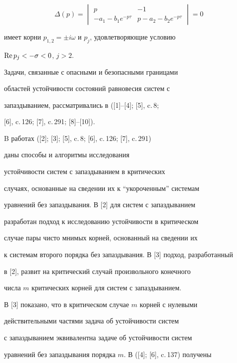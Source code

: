 \begin{equation} 


\Delta(p)= 


\begin{vmatrix} 


p & - 1 \\ -a_1-b_1e^{-p\tau} & p-a_2-b_2e^{-p\tau} 


\end{vmatrix} 


=0 


\end{equation} 


имеет корни $p_{1,2}=\pm i\omega$ и $p_j$, удовлетворяющие условию 


$\operatorname{Re} p_j<-\sigma<0$, $j>2$. 


 


Задачи, связанные с опасными и безопасными границами 


областей устойчивости состояний равновесия систем с 


запаздыванием, рассматривались в ([1]--[4]; [5], c.\,8; 


[6], c.\,126; [7], c.\,291; [8]--[10]). 


B работах ([2]; [3]; [5], c.\,8; [6], c.\,126; [7], c.\,291) 


даны способы и алгоритмы исследования 


устойчивости систем с запаздыванием в критических 


случаях, основанные на сведении их к ``укороченным'' системам 


уравнений без запаздывания. В [2] для систем с запаздыванием 


разработан подход к исследованию устойчивости в критическом 


случае пары чисто мнимых корней, основанный на сведении их 


к системам второго порядка без запаздывания. В [3] подход, разработанный 


в [2], развит на критический случай произвольного конечного 


числа $m$ критических корней для систем с запаздыванием. 


В [3] показано, что в критическом случае $m$ корней с нулевыми 


действительными частями задача об устойчивости систем 


с запаздыванием эквивалентна задаче об устойчивости систем 


уравнений без запаздывания порядка $m$. В ([4]; [6], c.\,137) получены 


